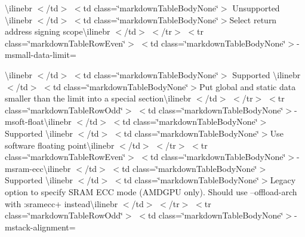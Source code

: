 \begin{longtabu}
{\ttfamily \textbackslash{}ilinebr \texorpdfstring{$<$}{<}/td\texorpdfstring{$>$}{>} \texorpdfstring{$<$}{<}td class=\char`\"{}markdown\+Table\+Body\+None\char`\"{}\texorpdfstring{$>$}{>} Unsupported \textbackslash{}ilinebr \texorpdfstring{$<$}{<}/td\texorpdfstring{$>$}{>} \texorpdfstring{$<$}{<}td class=\char`\"{}markdown\+Table\+Body\+None\char`\"{}\texorpdfstring{$>$}{>}}Select return address signing scope{\ttfamily \textbackslash{}ilinebr \texorpdfstring{$<$}{<}/td\texorpdfstring{$>$}{>} \texorpdfstring{$<$}{<}/tr\texorpdfstring{$>$}{>} \texorpdfstring{$<$}{<}tr class=\char`\"{}markdown\+Table\+Row\+Even\char`\"{}\texorpdfstring{$>$}{>} \texorpdfstring{$<$}{<}td class=\char`\"{}markdown\+Table\+Body\+None\char`\"{}\texorpdfstring{$>$}{>}}-\/msmall-\/data-\/limit=

{\ttfamily \textbackslash{}ilinebr \texorpdfstring{$<$}{<}/td\texorpdfstring{$>$}{>} \texorpdfstring{$<$}{<}td class=\char`\"{}markdown\+Table\+Body\+None\char`\"{}\texorpdfstring{$>$}{>} Supported \textbackslash{}ilinebr \texorpdfstring{$<$}{<}/td\texorpdfstring{$>$}{>} \texorpdfstring{$<$}{<}td class=\char`\"{}markdown\+Table\+Body\+None\char`\"{}\texorpdfstring{$>$}{>}}Put global and static data smaller than the limit into a special section{\ttfamily \textbackslash{}ilinebr \texorpdfstring{$<$}{<}/td\texorpdfstring{$>$}{>} \texorpdfstring{$<$}{<}/tr\texorpdfstring{$>$}{>} \texorpdfstring{$<$}{<}tr class=\char`\"{}markdown\+Table\+Row\+Odd\char`\"{}\texorpdfstring{$>$}{>} \texorpdfstring{$<$}{<}td class=\char`\"{}markdown\+Table\+Body\+None\char`\"{}\texorpdfstring{$>$}{>}}-\/msoft-\/float{\ttfamily \textbackslash{}ilinebr \texorpdfstring{$<$}{<}/td\texorpdfstring{$>$}{>} \texorpdfstring{$<$}{<}td class=\char`\"{}markdown\+Table\+Body\+None\char`\"{}\texorpdfstring{$>$}{>} Supported \textbackslash{}ilinebr \texorpdfstring{$<$}{<}/td\texorpdfstring{$>$}{>} \texorpdfstring{$<$}{<}td class=\char`\"{}markdown\+Table\+Body\+None\char`\"{}\texorpdfstring{$>$}{>}}Use software floating point{\ttfamily \textbackslash{}ilinebr \texorpdfstring{$<$}{<}/td\texorpdfstring{$>$}{>} \texorpdfstring{$<$}{<}/tr\texorpdfstring{$>$}{>} \texorpdfstring{$<$}{<}tr class=\char`\"{}markdown\+Table\+Row\+Even\char`\"{}\texorpdfstring{$>$}{>} \texorpdfstring{$<$}{<}td class=\char`\"{}markdown\+Table\+Body\+None\char`\"{}\texorpdfstring{$>$}{>}}-\/msram-\/ecc{\ttfamily \textbackslash{}ilinebr \texorpdfstring{$<$}{<}/td\texorpdfstring{$>$}{>} \texorpdfstring{$<$}{<}td class=\char`\"{}markdown\+Table\+Body\+None\char`\"{}\texorpdfstring{$>$}{>} Supported \textbackslash{}ilinebr \texorpdfstring{$<$}{<}/td\texorpdfstring{$>$}{>} \texorpdfstring{$<$}{<}td class=\char`\"{}markdown\+Table\+Body\+None\char`\"{}\texorpdfstring{$>$}{>}}Legacy option to specify SRAM ECC mode (AMDGPU only). Should use --offload-\/arch with \+:sramecc+ instead{\ttfamily \textbackslash{}ilinebr \texorpdfstring{$<$}{<}/td\texorpdfstring{$>$}{>} \texorpdfstring{$<$}{<}/tr\texorpdfstring{$>$}{>} \texorpdfstring{$<$}{<}tr class=\char`\"{}markdown\+Table\+Row\+Odd\char`\"{}\texorpdfstring{$>$}{>} \texorpdfstring{$<$}{<}td class=\char`\"{}markdown\+Table\+Body\+None\char`\"{}\texorpdfstring{$>$}{>}}-\/mstack-\/alignment=


\end{longtabu}
